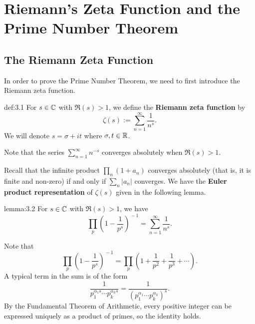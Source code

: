 \section{Riemann's Zeta Function and the Prime Number Theorem}\label{sec:3}

\subsection{The Riemann Zeta Function}\label{subsec:3.1}
In order to prove the Prime Number Theorem, we need to 
first introduce the Riemann zeta function. 

\begin{defn}{def:3.1}
For $s \in \mathbb{C}$ with $\Re(s) > 1$, we define the 
{\bf Riemann zeta function} by 
\[ \zeta(s) := \sum_{n=1}^\infty \frac1{n^s}. \]
We will denote $s = \sigma + it$ where $\sigma, t \in \mathbb{R}$. 
\end{defn}

Note that the series $\sum_{n=1}^\infty n^{-s}$ converges 
absolutely when $\Re(s) > 1$. 

Recall that the infinite product $\prod_n (1 + a_n)$ 
converges absolutely (that is, it is finite and non-zero)
if and only if $\sum_n |a_n|$ converges. We have the 
{\bf Euler product representation} of $\zeta(s)$ given 
in the following lemma. 

\begin{lemma}{lemma:3.2}
For $s \in \mathbb{C}$ with $\Re(s) > 1$, we have 
\[ \prod_p \left( 1 - \frac1{p^s} \right)^{\!-1} = 
\sum_{n=1}^\infty \frac1{n^s}. \]
\end{lemma}
\begin{pf}
Note that 
\[ \prod_p \left( 1 - \frac1{p^s} \right)^{\!-1} = 
\prod_p \left(1 + \frac1{p^2} + \frac1{p^3} + \cdots \right). \]
A typical term in the sum is of the form 
\[ \frac{1}{p_1^{\alpha_1s} \cdots p_k^{\alpha_ks}}
= \frac{1}{(p_1^{\alpha_1} \cdots p_k^{\alpha_k})^s}. \]
By the Fundamental Theorem of Arithmetic, every positive 
integer can be expressed uniquely as a product of primes, 
so the identity holds.
\end{pf}

